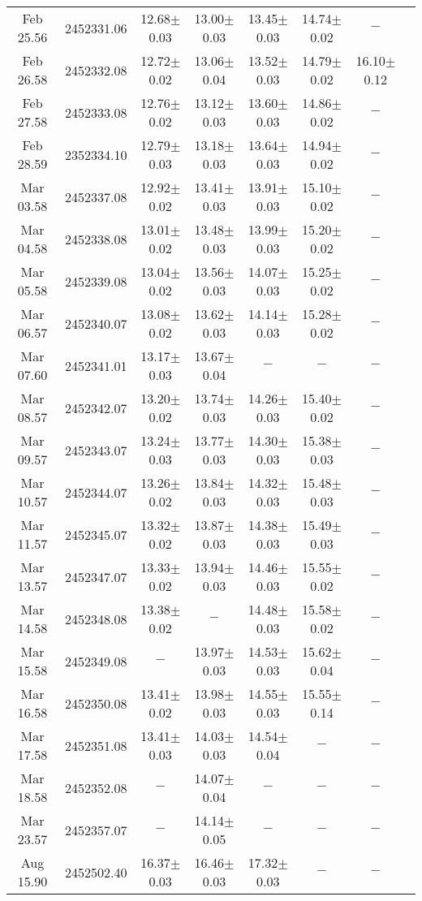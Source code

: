 \begin{table*}
\begin{center}
\begin{tabular}{cccccccc}
Feb 25.56 & 2452331.06  & 12.68$\pm$0.03&13.00$\pm$0.03&13.45$\pm$0.03&14.74$\pm$0.02&$-$&     				\\ 
Feb 26.58 & 2452332.08  & 12.72$\pm$0.02&13.06$\pm$0.04&13.52$\pm$0.03&14.79$\pm$0.02&16.10$\pm$0.12&    \\
Feb 27.58 & 2452333.08  & 12.76$\pm$0.02&13.12$\pm$0.03&13.60$\pm$0.03&14.86$\pm$0.02&$-$&\\
Feb 28.59 & 2352334.10  & 12.79$\pm$0.03&13.18$\pm$0.03&13.64$\pm$0.03&14.94$\pm$0.02&$-$ &    				\\
Mar 03.58 & 2452337.08  & 12.92$\pm$0.02&13.41$\pm$0.03&13.91$\pm$0.03&15.10$\pm$0.02&$-$& \\
Mar 04.58 & 2452338.08  & 13.01$\pm$0.02&13.48$\pm$0.03&13.99$\pm$0.03&15.20$\pm$0.02&$-$ &   		 		 \\ 
Mar 05.58 & 2452339.08  & 13.04$\pm$0.02&13.56$\pm$0.03&14.07$\pm$0.03&15.25$\pm$0.02&$-$  &   				\\ 
Mar 06.57 & 2452340.07  & 13.08$\pm$0.02&13.62$\pm$0.03&14.14$\pm$0.03&15.28$\pm$0.02& $-$		&	\\   
Mar 07.60 & 2452341.01  & 13.17$\pm$0.03&13.67$\pm$0.04&$-$       &$-$ 	     &$-$			&\\ 
Mar 08.57 & 2452342.07  & 13.20$\pm$0.02&13.74$\pm$0.03&14.26$\pm$0.03&15.40$\pm$0.02&  $-$    			&\\  
Mar 09.57 & 2452343.07  & 13.24$\pm$0.03&13.77$\pm$0.03&14.30$\pm$0.03&15.38$\pm$0.03&  $-$    	&	\\   
Mar 10.57 & 2452344.07  & 13.26$\pm$0.02&13.84$\pm$0.03&14.32$\pm$0.03&15.48$\pm$0.03&  $-$    	&		\\  
Mar 11.57 & 2452345.07  & 13.32$\pm$0.02&13.87$\pm$0.03&14.38$\pm$0.03&15.49$\pm$0.03&  $-$    	&		\\  
Mar 13.57 & 2452347.07  & 13.33$\pm$0.02&13.94$\pm$0.03&14.46$\pm$0.03&15.55$\pm$0.02&  $-$    	&		\\ 
Mar 14.58 & 2452348.08  & 13.38$\pm$0.02&$-$        &14.48$\pm$0.03&15.58$\pm$0.02&  $-$    	&		\\ 
Mar 15.58 & 2452349.08  & $-$       &13.97$\pm$0.03&14.53$\pm$0.03&15.62$\pm$0.04&  $-$    	&		\\ 
Mar 16.58 & 2452350.08  & 13.41$\pm$0.02&13.98$\pm$0.03&14.55$\pm$0.03&15.55$\pm$0.14&  $-$   	&			\\
Mar 17.58 & 2452351.08  & 13.41$\pm$0.03&14.03$\pm$0.03&14.54$\pm$0.04&$-$        &  $-$   	&			\\ 
Mar 18.58 & 2452352.08  & $-$       &14.07$\pm$0.04&$-$       &$-$  	     &$-$		&	\\
Mar 23.57 & 2452357.07  & $-$       &14.14$\pm$0.05&$-$       &$-$           &$-$    	&			\\ 
Aug 15.90 & 2452502.40  & 16.37$\pm$0.03&16.46$\pm$0.03&17.32$\pm$0.03 &$-$   & $-$ &  \\
\hline 
\hline
\end{tabular}
\end{center}
\end{table*}


